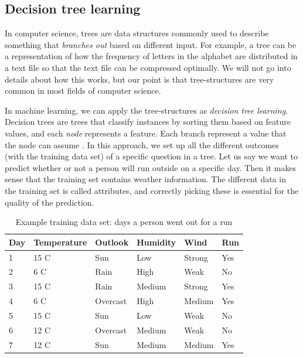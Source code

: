 \subsection{Decision tree learning}
In computer science, trees are data structures commonly used to describe something that \textit{branches out} based on different input. For example, 
a tree can be a representation of how the frequency of letters in the alphabet are distributed in a text file so that the text file can be compressed optimally. 
We will not go into details about how this works, but our point is that tree-structures are very common in most fields of computer science. 

In machine learning, we can apply the tree-structures as \textit{decision tree learning}. Decision trees are trees that classify instances by sorting them based on feature values, and each \textit{node} represents a feature. Each branch represent a value that the node can assume \cite{supervised_learning}.
In this approach, we set up all the different outcomes (with the training data set) of a specific question in a tree. Let us say we want to predict whether or not a person will run outside on a specific day. 
Then it makes sense that the training set contains weather information. The different data in the training set is called attributes, and correctly picking 
these is essential for the quality of the prediction.

\begin{table}
    \begin{tabular}{| l | l | l | l | l | l |}
    \hline
    \textbf{Day} & \textbf{Temperature} & \textbf{Outlook}   & \textbf{Humidity}  & \textbf{Wind}     & \textbf{Run} \\ \hline
            1    & 15 C                 & Sun                & Low                & Strong            & Yes \\
            2    & 6 C                  & Rain               & High               & Weak              & No  \\
            3    & 15 C                 & Rain               & Medium             & Strong            & Yes \\
            4    & 6 C                  & Overcast           & High               & Medium            & Yes \\
            5    & 15 C                 & Sun                & Low                & Weak              & No  \\
            6    & 12 C                 & Overcast           & Medium             & Weak              & No  \\
            7    & 12 C                 & Sun                & Medium             & Medium            & Yes \\
    \hline
    \end{tabular}
    \caption{Example training data set: days a person went out for a run}
    \label{table:days_running}
\end{table}

